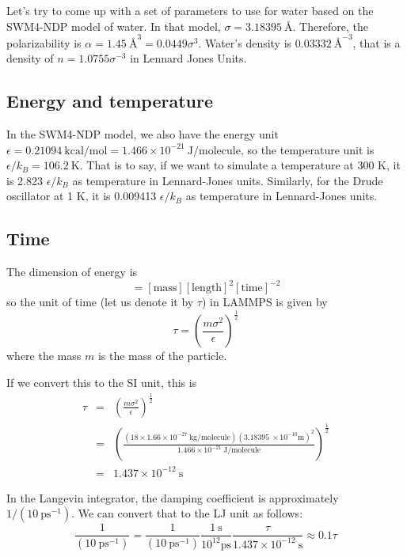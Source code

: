 \documentclass[aps, 12pt, amsmath, amssymb, onecolumn, notitlepage, nofootinbib]{revtex4-1}
\begin{document}
Let's try to come up with a set of parameters to use for water based on the SWM4-NDP model of water. In that model, $\sigma = 3.18395\ \text{\AA}$. Therefore, the polarizability is $\alpha = 1.45\ \text{\AA}^3 = 0.0449 \sigma^3$. Water's density is $0.03332\ \text{\AA}^{-3}$, that is a density of $n = 1.0755 \sigma^{-3}$ in Lennard Jones Units.


\subsection{Energy and temperature}

In the SWM4-NDP model, we also have the energy unit $\epsilon = 0.21094\ \text{kcal/mol} = 1.466 \times 10^{-21}\ \text{J/molecule}$, so the temperature unit is $\epsilon/k_B = 106.2\ \text{K}$. That is to say, if we want to simulate a temperature at 300 K, it is 2.823 $\epsilon/k_B$ as temperature in Lennard-Jones units. Similarly, for the Drude oscillator at 1 K, it is 0.009413  $\epsilon/k_B$ as temperature in Lennard-Jones units.
 

\subsection{Time}

The dimension of energy is 
\begin{equation}
[\text{energy}] = [\text{mass}][\text{length}]^2[\text{time}]^{-2}
\end{equation}
so the unit of time (let us denote it by $\tau$) in LAMMPS is given by
\begin{equation}
\tau = \left(\frac{m \sigma^2}{\epsilon}\right)^\frac{1}{2} 
\label{tau}
\end{equation}
where the mass $m$ is the mass of the particle.

If we convert this to the SI unit, this is
\begin{eqnarray}
\tau &=&  \left(\frac{m \sigma^2}{\epsilon}\right)^\frac{1}{2} \nonumber\\
&=& \left(\frac{(18 \times 1.66 \times 10^{-27}\ \text{kg/molecule} ) (3.18395\ \times 10^{-10} \text{m})^2}{1.466 \times 10^{-21}\ \text{J/molecule} }\right)^\frac{1}{2} \nonumber\\
&=& 1.437 \times 10^{-12}\ \text{s} 
\end{eqnarray}

In the Langevin integrator, the damping coefficient is approximately $1/(10\ \text{ps}^{-1})$. We can convert that to the LJ unit as follows:
\begin{equation}
\frac{1}{(10\ \text{ps}^{-1})} = \frac{1}{(10\ \text{ps}^{-1})} \frac{1\ \text{s}}{10^{12} \text{ps}}  \frac{\tau}{ 1.437 \times 10^{-12}\ \text{s}} \approx 0.1 \tau 
\end{equation}
%






\end{document}
